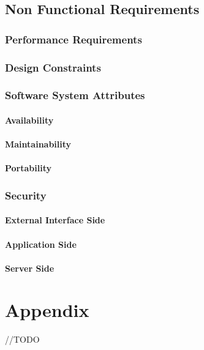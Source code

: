 \documentclass{report}
\begin{document}
	\section{Non Functional Requirements}

		\subsection{Performance Requirements}

		\subsection{Design Constraints}

		\subsection{Software System Attributes}

			\subsubsection{Availability}

			\subsubsection{Maintainability}

			\subsubsection{Portability}

		\subsection{Security}

			\subsubsection{External Interface Side}

			\subsubsection{Application Side}

			\subsubsection{Server Side}

\chapter{Appendix}
//TODO
\end{document}
